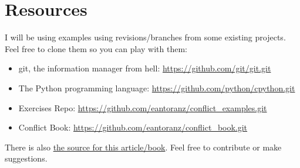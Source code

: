 
\section{Resources}

I will be using examples using revisions/branches from some existing projects. Feel free to clone them so you can play with them:

\begin{itemize}

	\item git, the information manager from hell: \url{https://github.com/git/git.git}
	\label{git_repo}

	\item The Python programming language: \url{https://github.com/python/cpython.git}
	\label{python_repo}
	
	\item Exercises Repo: \url{https://github.com/eantoranz/conflict_examples.git}
	\label{exercises_repo}

	\item Conflict Book: \url{https://github.com/eantoranz/conflict_book.git}
	\label{book_repo}
	
\end{itemize}

There is also \href{https://github.com/eantoranz/conflict_book.git}{the source for this article/book}.
Feel free to contribute or make suggestions.
